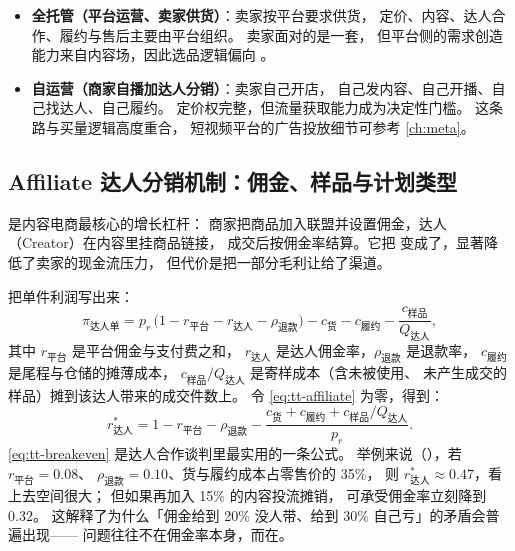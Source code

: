 \begin{itemize}
  \item \textbf{全托管（平台运营、卖家供货）}：卖家按平台要求供货，
        定价、内容、达人合作、履约与售后主要由平台组织。
        卖家面对的是一套，
        但平台侧的需求创造能力来自内容场，因此选品逻辑偏向
        。
  \item \textbf{自运营（商家自播加达人分销）}：卖家自己开店，
        自己发内容、自己开播、自己找达人、自己履约。
        定价权完整，但流量获取能力成为决定性门槛。
        这条路与买量逻辑高度重合，
        短视频平台的广告投放细节可参考 \cref{ch:meta}。
\end{itemize}

\subsection{Affiliate 达人分销机制：佣金、样品与计划类型}

 是内容电商最核心的增长杠杆：
商家把商品加入联盟并设置佣金，达人（Creator）在内容里挂商品链接，
成交后按佣金率结算。它把
变成了，显著降低了卖家的现金流压力，
但代价是把一部分毛利让给了渠道。

把单件利润写出来：
\begin{equation}
\pi_{\text{达人单}}
= p_{r}\,\big(1 - r_{\text{平台}} - r_{\text{达人}} - \rho_{\text{退款}}\big)
- c_{\text{货}} - c_{\text{履约}} - \frac{c_{\text{样品}}}{Q_{\text{达人}}} ,
\label{eq:tt-affiliate}
\end{equation}
其中 $r_{\text{平台}}$ 是平台佣金与支付费之和，
$r_{\text{达人}}$ 是达人佣金率，$\rho_{\text{退款}}$ 是退款率，
$c_{\text{履约}}$ 是尾程与仓储的摊薄成本，
$c_{\text{样品}}/Q_{\text{达人}}$ 是寄样成本（含未被使用、
未产生成交的样品）摊到该达人带来的成交件数上。
令 \cref{eq:tt-affiliate} 为零，得到：
\begin{equation}
r_{\text{达人}}^{*}
= 1 - r_{\text{平台}} - \rho_{\text{退款}}
- \frac{c_{\text{货}} + c_{\text{履约}} + c_{\text{样品}}/Q_{\text{达人}}}{p_{r}} .
\label{eq:tt-breakeven}
\end{equation}
\cref{eq:tt-breakeven} 是达人合作谈判里最实用的一条公式。
举例来说（），若 $r_{\text{平台}} = 0.08$、
$\rho_{\text{退款}} = 0.10$、货与履约成本占零售价的 35\%，
则 $r_{\text{达人}}^{*} \approx 0.47$，看上去空间很大；
但如果再加入 15\% 的内容投流摊销，
可承受佣金率立刻降到 0.32。
这解释了为什么「佣金给到 20\% 没人带、给到 30\% 自己亏」的矛盾会普遍出现——
问题往往不在佣金率本身，而在。

